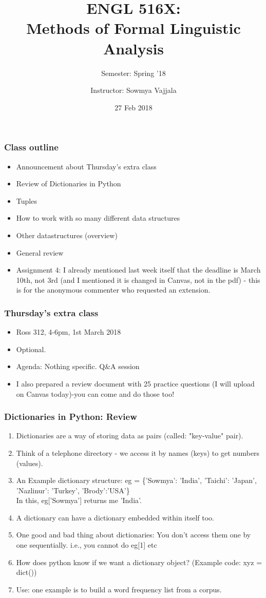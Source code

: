 \documentclass{beamer}
\author[Sowmya Vajjala]{Instructor: Sowmya Vajjala}
\title[ENGL 516X]{ENGL 516X: \\ Methods of Formal Linguistic Analysis}
\subtitle{Semester: Spring '18}
\date{27 Feb 2018}
\institute{Iowa State University, USA}
\begin{document}
\begin{frame}\titlepage
\end{frame}

\begin{frame}%
\frametitle{Class outline}
\begin{itemize}
\item Announcement about Thursday's extra class
\item Review of Dictionaries in Python %
\item Tuples %
\item How to work with so many different data structures %
\item Other datastructures (overview) %
\item General review
\item Assignment 4: I already mentioned last week itself that the deadline is March 10th, not 3rd (and I mentioned it is changed in Canvas, not in the pdf) - this is for the anonymous commenter who requested an extension.
\end{itemize}
\end{frame}

\begin{frame}
\frametitle{Thursday's extra class}
\begin{itemize}
\item Ross 312, 4-6pm, 1st March 2018
\item Optional.
\item Agenda: Nothing specific. Q\&A session
\item I also prepared a review document with 25 practice questions (I will upload on Canvas today)-you can come and do those too!
\end{itemize}
\end{frame}

\begin{frame}%
\frametitle{Dictionaries in Python: Review}
\begin{enumerate}
\item Dictionaries are a way of storing data as pairs (called: "key-value" pair). \pause
\item Think of a telephone directory - we access it by names (keys) to get numbers (values). 
\item An Example dictionary structure: eg = \{'Sowmya': 'India', 'Taichi': 'Japan', 'Nazlinur': 'Turkey', 'Brody':'USA'\} \pause
\\ In this, eg['Sowmya'] returns me 'India'.
\item A dictionary can have a dictionary embedded within itself too.
\item One good and bad thing about dictionaries: You don't access them one by one sequentially. i.e., you cannot do eg[1] etc
\item How does python know if we want a dictionary object? (Example code: xyz = dict())
\item Use: one example is to build a word frequency list from a corpus. 
\end{enumerate}
\end{frame}
\end{document}
